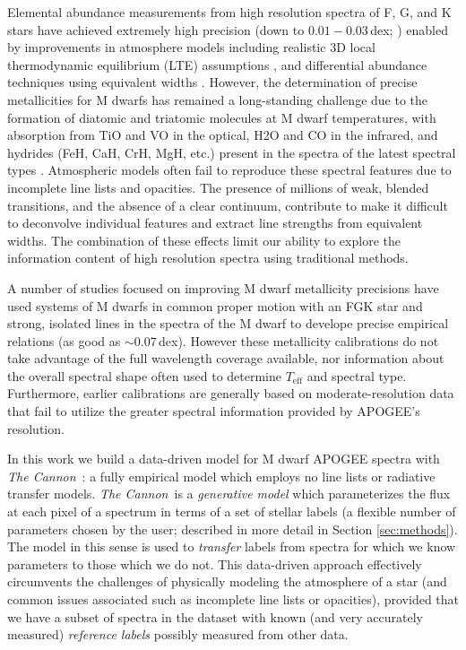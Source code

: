 \documentclass[twocolumn]{aastex62}
\newcommand{\thecannon}{\textsl{The Cannon}}
\newcommand{\teff}{T_{\mathrm{eff}}}
\begin{document}
Elemental abundance measurements from high resolution spectra of F, G, and K stars have achieved extremely high precision (down to $0.01-0.03$\,dex; \citealt{Nissen2018}) enabled by improvements in atmosphere models including realistic 3D local thermodynamic equilibrium (LTE) assumptions \citep{Asplund2005}, and differential abundance techniques using equivalent widths \citep{Bedell2014}. However, the determination of precise metallicities for M dwarfs has remained a long-standing challenge due to the formation of diatomic and triatomic molecules at M dwarf temperatures, with absorption from TiO and VO in the optical, H2O and CO in the infrared, and hydrides (FeH, CaH, CrH, MgH, etc.) present in the spectra of the latest spectral types \citep{Allard1997}.
Atmospheric models often fail to reproduce these spectral features \citep[e.g.,][]{Mann:2013c} due to incomplete line lists and opacities. The presence of millions of weak, blended transitions, and the absence of a clear continuum, contribute to make it difficult to deconvolve individual features and extract line strengths from equivalent widths. The combination of these effects limit our ability to explore the information content of high resolution spectra using traditional methods.

A number of studies focused on improving M dwarf metallicity precisions have used systems of M dwarfs in common proper motion with an FGK star and strong, isolated lines in the spectra of the M dwarf \citep[e.g.,][]{Terrien:2012,RojasAyala:2010,Newton:2014,Neves:2014,Lindgren:2016} to develope precise empirical relations (as good as $\sim$0.07\,dex). 
However these metallicity calibrations do not take advantage of the full wavelength coverage available, nor information about the overall spectral shape often used to determine $\teff$ and spectral type. Furthermore, earlier calibrations are generally based on moderate-resolution data \citep[with some exceptions,][]{Neves:2014, Lindgren:2016} that fail to utilize the greater spectral information provided by APOGEE's resolution.

In this work we build a data-driven model for M dwarf APOGEE spectra with \thecannon\ \citep{Ness:2015,Casey:2016,Ho:2017a,Behmard2019}: a fully empirical model which employs no line lists or radiative transfer models. 
\thecannon\ is a \emph{generative model} which parameterizes the flux at each pixel of a spectrum in terms of a set of stellar labels (a flexible number of parameters chosen by the user; described in more detail in Section \ref{sec:methods}). The model in this sense is used to \emph{transfer} labels from spectra for which we know parameters to those which we do not. This data-driven approach effectively circumvents the challenges of physically modeling the atmosphere of a star (and common issues associated such as incomplete line lists or opacities), provided that we have a subset of spectra in the dataset with known (and very accurately measured) \emph{reference labels} possibly measured from other data. 
\end{document}
